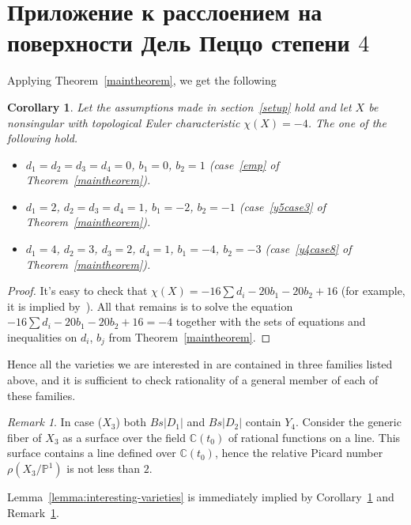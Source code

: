 \documentclass[12pt]{amsart}
\newtheorem{corollary}[equation]{Corollary}
\theoremstyle{definition}
\theoremstyle{remark}
\newtheorem{remark}[equation]{Remark}
\begin{document}
\section{Приложение к расслоением на поверхности Дель Пеццо степени $4$}
\label{application}

Applying Theorem~\ref{maintheorem}, we get the following
\begin{corollary}\label{corollary:chi-4}
Let the assumptions made in section~\ref{setup} hold and let 
$X$ be nonsingular with topological Euler characteristic $\chi(X)=-4$.
The one of the following hold.
\begin{itemize}
\item[($X_1$)] $d_1=d_2=d_3=d_4=0$, $b_1=0$, $b_2=1$ 
(case~\ref{emp} of Theorem~\ref{maintheorem}).
\item[($X_2$)] $d_1=2$, $d_2=d_3=d_4=1$, $b_1=-2$, $b_2=-1$
(case~\ref{y5case3} of Theorem~\ref{maintheorem}).
\item[($X_3$)] $d_1=4$, $d_2=3$, $d_3=2$, $d_4=1$, $b_1=-4$, $b_2=-3$
(case~\ref{y4case8} of Theorem~\ref{maintheorem}).
\end{itemize}
\end{corollary}
\begin{proof}
It's easy to check that $\chi(X)=-16\sum d_i-20b_1-20b_2+16$ 
(for example, it is implied by~\cite[Example~3.2.11]{Fulton}). 
All that remains is to solve the equation 
$-16\sum d_i-20b_1-20b_2+16=-4$ together with the sets of equations and inequalities on $d_i$, $b_j$ from Theorem~\ref{maintheorem}.
\end{proof}



Hence all the varieties we are interested in are contained in three families
listed above, and it is sufficient to check rationality of a general member 
of each of these families.

\begin{remark}\label{remark-on-X3-Picard}
In case ($X_3$) both $Bs|D_1|$ and $Bs|D_2|$ contain $Y_4$.
Consider the generic fiber of $X_3$ as a surface over the field 
${\mathbb{C}}(t_0)$ of rational functions on a line. This surface contains 
a line defined over ${\mathbb{C}}(t_0)$, hence the relative Picard number 
$\rho(X_3/{\mathbb{P}}^1)$ is not less than $2$.
\end{remark}

Lemma~\ref{lemma:interesting-varieties} is immediately implied by
Corollary~\ref{corollary:chi-4} and 
Remark~\ref{remark-on-X3-Picard}.
\end{document}
